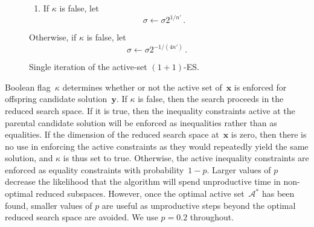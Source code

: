 \documentclass[oribibl]{llncs}
\newcommand{\x}{\ensuremath{\mathbf{x}}}
\newcommand{\y}{\ensuremath{\mathbf{y}}}
\begin{document}
\begin{figure}[t]
{\begin{minipage}{.98\linewidth}
{\begin{enumerate}
\begin{enumerate}
\begin{displaymath}
            \end{displaymath}
	  \item If $\kappa$ is false, let
	    \begin{displaymath}
	      \sigma\gets\sigma2^{1/n'}\,.
	    \end{displaymath}
	\end{enumerate}\vspace{2mm}
        Otherwise, if $\kappa$ is false, let
        \begin{displaymath}
          \sigma\gets\sigma2^{-1/(4n')}\,.
        \end{displaymath}
    \end{enumerate}}\hspace{4mm}
    \end{minipage}}
  \caption{\label{fig1}Single iteration of the active-set $(1+1)$-ES.}
\end{figure}

Boolean flag~$\kappa$ determines whether or not the active set of~$\x$ is enforced for offspring candidate solution~$\y$. If $\kappa$ is false, then the search proceeds in the reduced search space. If it is true, then the inequality constraints active at the parental candidate solution will be enforced as inequalities rather than as equalities. If the dimension of the reduced search space at~$\x$ is zero, then there is no use in enforcing the active constraints as they would repeatedly yield the same solution, and $\kappa$ is thus set to true. Otherwise, the active inequality constraints are enforced as equality constraints with probability~$1-p$. Larger values of $p$ decrease the likelihood that the algorithm will spend unproductive time in non-optimal reduced subspaces. However, once the optimal active set~$\mathcal{A}^*$ has been found, smaller values of $p$ are useful as unproductive steps beyond the optimal reduced search space are avoided. We use $p=0.2$ throughout.
\end{document}
